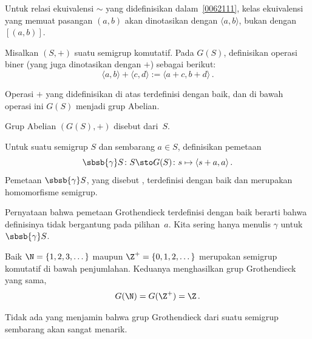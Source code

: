\begin{notn} Untuk relasi ekuivalensi $\sim$ yang didefinisikan dalam~\ref{0062111}, kelas ekuivalensi
yang memuat pasangan $(a,b)$ akan dinotasikan dengan %
$\langle a,b \rangle$, bukan dengan~$[(a,b)]$.
\end{notn}

\begin{defn} Misalkan $(S,+)$ suatu semigrup komutatif. Pada $G(S)$, definisikan operasi biner
(yang juga dinotasikan dengan $+$) sebagai berikut:
  \[ \langle a,b \rangle + \langle c,d \rangle := \langle a + c,b + d\rangle\,. \]
\end{defn}

\begin{prop}\label{0062119} Operasi $+$ yang didefinisikan di atas terdefinisi dengan baik, dan di bawah
operasi ini $G(S)$ menjadi grup Abelian. %
\end{prop}

Grup Abelian $(G(S),+)$ disebut
 dari~$S$.

\begin{prop}\label{0062124} Untuk suatu semigrup $S$ dan sembarang $a \in S$, definisikan
pemetaan
   \[ \sbsb{\gamma}S \colon S \sto G(S) \colon s \mapsto \langle s + a, a \rangle\,. \]
Pemetaan $\sbsb{\gamma}S$, yang disebut
, terdefinisi dengan baik dan merupakan homomorfisme semigrup.
\end{prop}

Pernyataan bahwa pemetaan Grothendieck terdefinisi dengan baik berarti bahwa definisinya tidak bergantung
pada pilihan~$a$. Kita sering hanya menulis $\gamma$ untuk~$\sbsb{\gamma}S$.

\begin{exam}\label{0062126} Baik $\N = \{1,2,3,\dots\}$ maupun $\Z^+ = \{0,1,2,\dots\}$ merupakan
semigrup komutatif di bawah penjumlahan. Keduanya menghasilkan grup Grothendieck yang sama,
   \[G(\N) = G(\Z^+) = \Z\,. \]
\end{exam}

Tidak ada yang menjamin bahwa grup Grothendieck dari suatu semigrup sembarang akan sangat menarik.

